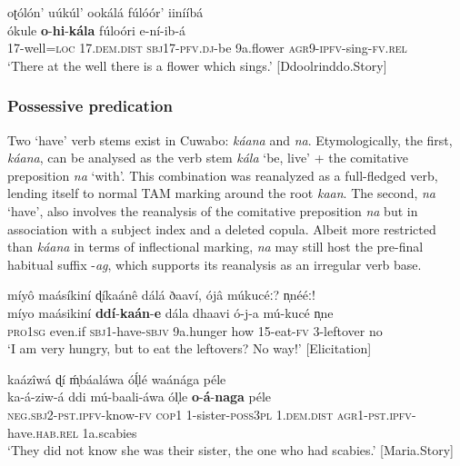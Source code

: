 \documentclass[output=paper,colorlinks=true, citecolor=brown,draftmode]{langscibook}
\begin{document}
\ea\label{ex:cuw:32} oʈólón’ uúkúl’ ookálá fúlóór’ iinííbá\\ 
               {ókule} \textbf{o}{}-\textbf{hi}{}-\textbf{kála}        {fúloóri}   {e-ní-ib-á}\\
          {17-well=\textsc{loc}}  {17.\textsc{dem.dist}}    {\textsc{sbj1}7-\textsc{pfv}.\textsc{dj}{}-be} {9a.flower} {\textsc{agr}9-\textsc{ipfv-}sing-\textsc{fv.rel}}\\
    \glt ‘There at the well there is a flower which sings.’ [Ddoolrinddo.Story]
\z 

\subsubsection{Possessive predication}\label{sec:cuw:2.3.5}
Two ‘have’ verb stems exist in Cuwabo: \textit{káana} and \textit{na}. Etymologically, the first, \textit{káana}, can be analysed as the verb stem \textit{kála} ‘be, live’ + the comitative preposition \textit{na} ‘with’. This combination was reanalyzed as a full-fledged verb, lending itself to normal TAM marking around the root \textit{kaan}. The second, \textit{na} ‘have’, also involves the reanalysis of the comitative preposition \textit{na} but in association with a subject index and a deleted copula. Albeit more restricted than \textit{káana} in terms of inflectional marking, \textit{na} may still host the pre-final habitual suffix \nobreakdash-\textit{ag}, which supports its reanalysis as an irregular verb base.

\ea\label{ex:cuw:33}
    \ea\label{ex:cuw:33a} míyô maásíkiní ɖíkaánê dálá ðaaví, ójâ múkucéː? n̩nééː!\\
        \gll  míyo maásikiní \textbf{ddí}{}-\textbf{kaán}{}-\textbf{e} dála dhaavi ó-j-a mú-kucé n̩ne  \\
            \textsc{pro1sg} even.if \textsc{sbj1}-have-\textsc{sbjv} 9a.hunger how \textsc{15}{}-eat-\textsc{fv} 3-leftover no \\
        \glt ‘I am very hungry, but to eat the leftovers? No way!’ [Elicitation]

    \ex\label{ex:cuw:33b} kaázîwá ɖí ḿ̩báaláwa óĺ̩lé waánága péle\\
        \gll  ka-á-ziw-á ddi mú-baali-áwa ól̩le \textbf{o}{}-\textbf{á}{}-\textbf{naga} péle \\
              \textsc{neg.sbj2}-\textsc{pst}.\textsc{ipfv}{}-know-\textsc{fv} \textsc{cop1} 1-sister-\textsc{poss3pl} 1.\textsc{dem.dist} \textsc{agr}1-\textsc{pst.ipfv}{}-have.\textsc{hab.rel} 1a.scabies \\
        \glt ‘They did not know she was their sister, the one who had scabies.’ [Maria.Story] 
    \z
\z 
\end{document}
